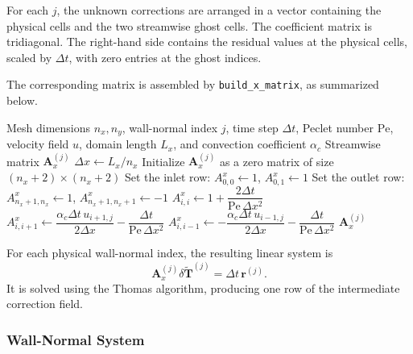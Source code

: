 For each $j$, the unknown corrections are arranged in a
vector containing the physical cells and the two streamwise
ghost cells. The coefficient matrix is tridiagonal. The
right-hand side contains the residual values at the physical
cells, scaled by $\Delta t$, with zero entries at the ghost
indices.

The corresponding matrix is assembled by
\texttt{build\_x\_matrix}, as summarized below.

\begin{algorithm}[H]
\caption{Construction of the Streamwise Coefficient Matrix}
\label{alg:apf_build_x_matrix}
\begin{algorithmic}[1]
\Require Mesh dimensions $n_x,n_y$, wall-normal index $j$,
time step $\Delta t$, Peclet number $\mathrm{Pe}$, velocity
field $u$, domain length $L_x$, and convection coefficient
$\alpha_c$
\Ensure Streamwise matrix $\mathbf{A}_x^{(j)}$
\State $\Delta x \gets L_x/n_x$
\State Initialize $\mathbf{A}_x^{(j)}$ as a zero matrix of
size $(n_x+2)\times(n_x+2)$
\State Set the inlet row:
$A^x_{0,0}\gets1$, $A^x_{0,1}\gets1$
\State Set the outlet row:
$A^x_{n_x+1,n_x}\gets1$,
$A^x_{n_x+1,n_x+1}\gets-1$
    \State $A^x_{i,i}
    \gets 1+\dfrac{2\Delta t}{\mathrm{Pe}\,\Delta x^2}$
    \State $A^x_{i,i+1}
    \gets \dfrac{\alpha_c\Delta t\,u_{i+1,j}}{2\Delta x}
    -\dfrac{\Delta t}{\mathrm{Pe}\,\Delta x^2}$
    \State $A^x_{i,i-1}
    \gets -\dfrac{\alpha_c\Delta t\,u_{i-1,j}}{2\Delta x}
    -\dfrac{\Delta t}{\mathrm{Pe}\,\Delta x^2}$
\EndFor
\State \Return $\mathbf{A}_x^{(j)}$
\end{algorithmic}
\end{algorithm}

For each physical wall-normal index, the resulting linear
system is
\begin{equation}
\boxed{
\mathbf{A}_x^{(j)}
\delta\widetilde{\mathbf{T}}^{(j)}
=
\Delta t\,\mathbf{r}^{(j)}.
}
\label{eq:apf_x_matrix_system}
\end{equation}
It is solved using the Thomas algorithm, producing one row
of the intermediate correction field.

\subsubsection{Wall-Normal System}

